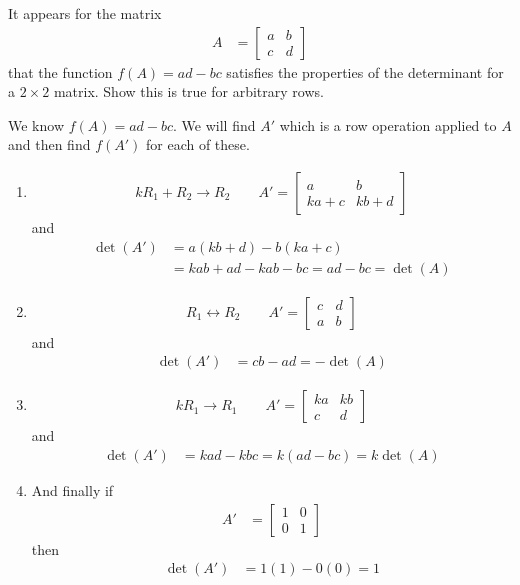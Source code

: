 \begin{example}
It appears for the matrix %
%
\begin{align*}
A & = \begin{bmatrix}
a & b \\ c & d 
\end{bmatrix}
\end{align*}
that the function $f(A) = ad-bc$ satisfies the properties of the determinant for a $2 \times 2$ matrix.  Show this is true for arbitrary rows. 

\solution

We know $f(A)=ad-bc$.  We will find $A'$ which is a row operation applied to $A$ and then find $f(A')$ for each of these.

\begin{enumerate}
\item 
\begin{align*}
kR_1 +R_2 \rightarrow R_2  \qquad A' =  \begin{bmatrix}
a & b \\ ka +c & kb + d 
\end{bmatrix}
\end{align*}
and 
\begin{align*}
\det(A')  & = a(kb+d) - b(ka+c) \\
& = kab+ad-kab-bc = ad-bc = \det(A)
\end{align*}

\item 
\begin{align*}
R_1 \leftrightarrow R_2 \qquad A' = \begin{bmatrix}
c & d \\ a & b 
\end{bmatrix}
\end{align*}
and
\begin{align*}
\det(A') & = cb-ad = -\det(A)
\end{align*}

\item 
\begin{align*}
kR_1 \rightarrow R_1 \qquad A' = \begin{bmatrix}
ka & kb \\ c & d
\end{bmatrix}
\end{align*}
and
\begin{align*}
\det(A') & = kad-kbc=k(ad-bc) = k\det(A)
\end{align*}

\item And finally if
%
\begin{align*}
A' & = \begin{bmatrix}
1 & 0 \\ 0 & 1
\end{bmatrix}
\end{align*}
then
%
\begin{align*}
\det(A') & = 1(1)-0(0) = 1 
\end{align*}



\end{enumerate}
\end{example}

